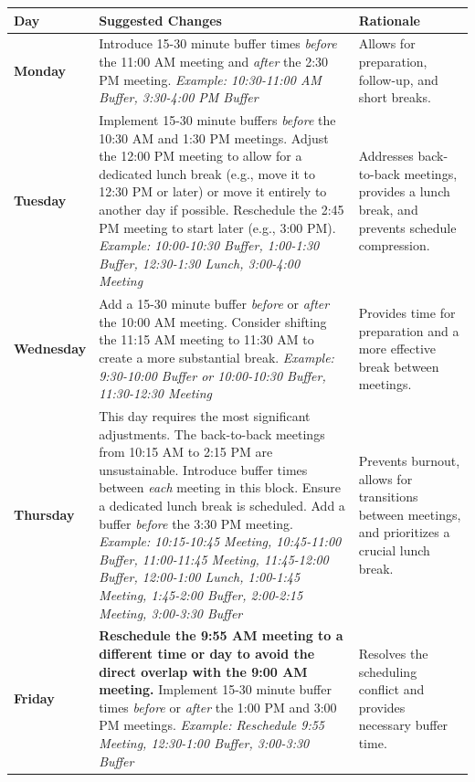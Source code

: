 \documentclass{article}
\begin{document}
\begin{tabular}{|>{\bfseries}m{2cm}|m{11cm}|m{4cm}|} %
\hline
\textbf{Day} & \textbf{Suggested Changes} & \textbf{Rationale} \\
\hline
Monday & Introduce 15-30 minute buffer times \textit{before} the 11:00 AM meeting and \textit{after} the 2:30 PM meeting. \newline \textit{Example: 10:30-11:00 AM Buffer, 3:30-4:00 PM Buffer} & Allows for preparation, follow-up, and short breaks. \\
\hline
Tuesday & Implement 15-30 minute buffers \textit{before} the 10:30 AM and 1:30 PM meetings. Adjust the 12:00 PM meeting to allow for a dedicated lunch break (e.g., move it to 12:30 PM or later) or move it entirely to another day if possible. Reschedule the 2:45 PM meeting to start later (e.g., 3:00 PM). \newline \textit{Example: 10:00-10:30 Buffer, 1:00-1:30 Buffer, 12:30-1:30 Lunch, 3:00-4:00 Meeting} & Addresses back-to-back meetings, provides a lunch break, and prevents schedule compression. \\
\hline
Wednesday & Add a 15-30 minute buffer \textit{before} or \textit{after} the 10:00 AM meeting. Consider shifting the 11:15 AM meeting to 11:30 AM to create a more substantial break. \newline \textit{Example: 9:30-10:00 Buffer or 10:00-10:30 Buffer, 11:30-12:30 Meeting} & Provides time for preparation and a more effective break between meetings. \\
\hline
Thursday & This day requires the most significant adjustments. The back-to-back meetings from 10:15 AM to 2:15 PM are unsustainable. Introduce buffer times between \textit{each} meeting in this block. Ensure a dedicated lunch break is scheduled. Add a buffer \textit{before} the 3:30 PM meeting. \newline \textit{Example: 10:15-10:45 Meeting, 10:45-11:00 Buffer, 11:00-11:45 Meeting, 11:45-12:00 Buffer, 12:00-1:00 Lunch, 1:00-1:45 Meeting, 1:45-2:00 Buffer, 2:00-2:15 Meeting, 3:00-3:30 Buffer} & Prevents burnout, allows for transitions between meetings, and prioritizes a crucial lunch break. \\
\hline
Friday & \textbf{Reschedule the 9:55 AM meeting to a different time or day to avoid the direct overlap with the 9:00 AM meeting.} Implement 15-30 minute buffer times \textit{before} or \textit{after} the 1:00 PM and 3:00 PM meetings. \newline \textit{Example: Reschedule 9:55 Meeting, 12:30-1:00 Buffer, 3:00-3:30 Buffer} & Resolves the scheduling conflict and provides necessary buffer time. \\
\hline
\end{tabular}
\end{document}
